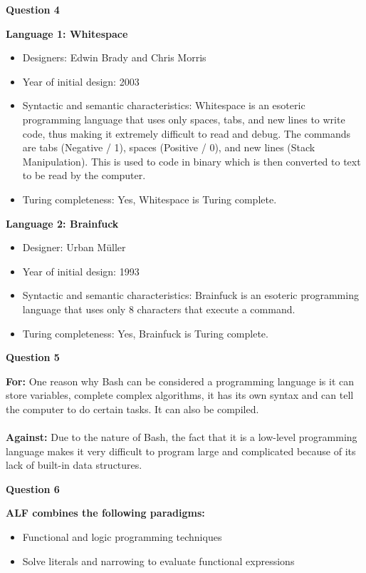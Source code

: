 \documentclass{article}
\begin{document}
\begin{center}
    \large
    \textbf{Question 4}
    \normalsize
\end{center}
\textbf{Language 1: Whitespace} \cite{whitespace}
\begin{itemize}
    \item Designers: Edwin Brady and Chris Morris
    \item Year of initial design: 2003
    \item Syntactic and semantic characteristics: Whitespace is an esoteric programming language that uses only spaces, tabs, and new lines to write code, thus making it extremely difficult to read and debug.
          The commands are tabs (Negative / 1), spaces (Positive / 0), and new lines (Stack Manipulation). This is used to code in binary which is then converted to text to be read by the computer.
    \item Turing completeness: Yes, Whitespace is Turing complete.
\end{itemize}
\textbf{Language 2: Brainfuck} \cite{brainfuck}
\begin{itemize}
    \item Designer: Urban Müller
    \item Year of initial design: 1993
    \item Syntactic and semantic characteristics: Brainfuck is an esoteric programming language that uses only 8 characters that execute a command.
    \item Turing completeness: Yes, Brainfuck is Turing complete.
\end{itemize}


\begin{center}
    \large
    \textbf{Question 5}
    \normalsize
\end{center}
\textbf{For:} \cite{bash}
One reason why Bash can be considered a programming language is it can store variables, complete complex algorithms, it has its own syntax and can tell the computer to do certain tasks. It can also be compiled.\\\\
\textbf{Against:} \cite{bash-unix}
Due to the nature of Bash, the fact that it is a low-level programming language makes it very difficult to program large and complicated because of its lack of built-in data structures.\\


\begin{center}
    \large
    \textbf{Question 6}
    \normalsize
\end{center}
\textbf{ALF combines the following paradigms:} \cite{programming-languages} \cite{alf}
\begin{itemize}
    \item Functional and logic programming techniques
    \item Solve literals and narrowing to evaluate functional expressions
\end{itemize}
\end{document}

